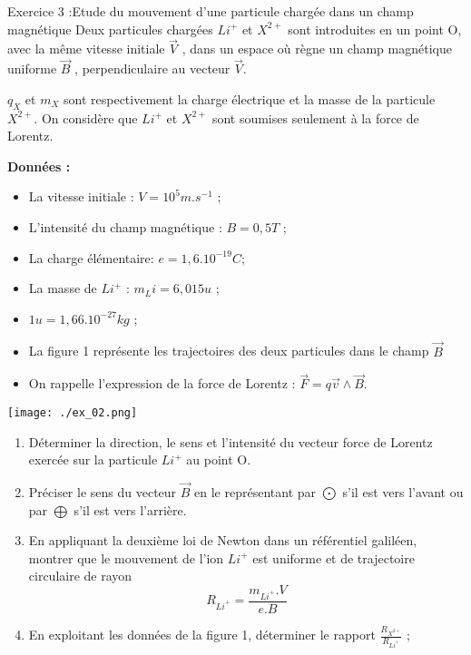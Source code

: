 \documentclass[12pt, french]{article}
\begin{document}
\begin{Box2}{Exercice 3 :Etude du mouvement d’une particule chargée dans un champ magnétique  }
	Deux particules chargées $Li^+$ et $X^{2+}$ sont introduites en un point O, avec la même vitesse
	initiale $\vec{V}$ , dans un espace où règne un champ magnétique uniforme $\vec{B}$ , perpendiculaire au
	vecteur $\vec{V}$.

	$q_X$ et $m_X$ sont respectivement la charge électrique et la masse de la particule $X^{2+}$.
	On considère que $Li^+$ et $X^{2+}$ sont soumises
seulement à la force de Lorentz.

\textbf{Données : }
\begin{itemize}
\item La vitesse initiale : $V=10^5 m.s^{-1}$ ;
\item L’intensité du champ magnétique : $B= 0,5T$ ;
\item La charge élémentaire: $e =1,6.10^{-19} C$;
\item La masse de $Li^+$ : $m_Li = 6,015u$ ;
\item $1u=1,66.10^{-27} kg$ ;
\item La figure 1 représente les trajectoires des deux particules dans le champ $\vec{B}$
\item On rappelle l’expression de la force de Lorentz : $\vec{F} = q\vec{v} \wedge \vec{B}$.
\end{itemize}
 
\begin{center}
	  \vspace{-0.6cm}
	\texttt{[image: ./ex\_02.png]}
  \end{center}

  \begin{enumerate}
	\item Déterminer la direction, le sens et l’intensité du vecteur force de Lorentz exercée sur la particule $Li^+$ au point O.


	\item Préciser le sens du vecteur $\vec{B}$ en le représentant par $\bigodot$ s’il est vers l’avant ou par $\bigoplus$ s’il est vers l’arrière.

	\item En appliquant la deuxième loi de Newton dans un référentiel galiléen, montrer que le mouvement de l’ion $Li^+$ est uniforme et de trajectoire circulaire de rayon $$R_{Li^+} = \frac{m_{Li^+}.V}{e.B}$$

\item En exploitant les données de la figure 1, déterminer le rapport $\frac{R_{X^{2+}}}{R_{Li^+}}$ ;


\end{enumerate}
\end{Box2}
\end{document}

